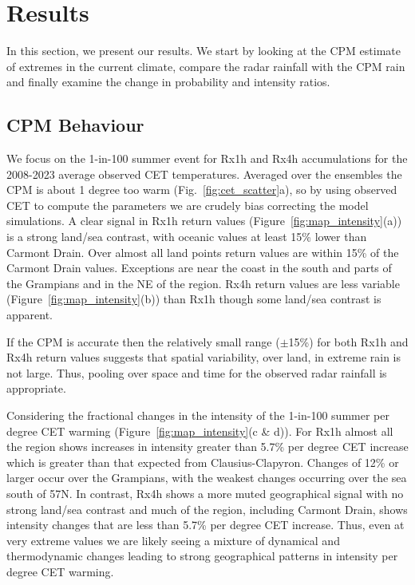 \documentclass[11pt,a4paper]{article}
\begin{document}
\section{Results}

In this section, we present our results. We start by looking at the CPM estimate of extremes in the current climate, compare the radar rainfall with the CPM rain and finally examine the change in probability and intensity ratios. 
\subsection{CPM Behaviour}
We focus on the 1-in-100 summer event for Rx1h and Rx4h accumulations for the  2008-2023 average observed CET temperatures. Averaged over the  ensembles the CPM is about 1 degree too warm (Fig.~\ref{fig:cet_scatter}a), so by using observed CET to compute the parameters we are crudely bias correcting the model simulations. A clear signal in Rx1h return values (Figure~\ref{fig:map_intensity}(a)) is a strong land/sea contrast, with oceanic values at least 15\% lower than Carmont Drain.  Over almost all  land points return values are within 15\% of the Carmont Drain values. Exceptions are near the coast in the south and parts of the Grampians  and in the NE of the region. Rx4h  return values are less variable (Figure~\ref{fig:map_intensity}(b)) than Rx1h though some land/sea contrast is apparent.  

If the CPM is accurate then the relatively small range ($\pm$15\%) for both Rx1h and Rx4h  return values suggests that spatial variability, over land,  in extreme rain is not large.  Thus, pooling over space and time for the observed radar rainfall is appropriate. 


Considering the fractional changes in the intensity of the 1-in-100 summer per degree CET warming (Figure~\ref{fig:map_intensity}(c \& d)). For Rx1h almost all the region shows increases in intensity greater than 5.7\% per degree CET increase which is greater than that expected from Clausius-Clapyron. Changes of 12\% or larger occur over the Grampians, with the weakest changes occurring over the sea south of 57N. In contrast, Rx4h shows a  more muted geographical signal with no strong land/sea contrast and much of the region, including Carmont Drain, shows intensity changes that are less than  5.7\% per degree CET increase.  Thus, even at very extreme values we are likely seeing a mixture of dynamical and thermodynamic  changes leading to  strong geographical patterns in  intensity per degree CET warming.
\end{document}
